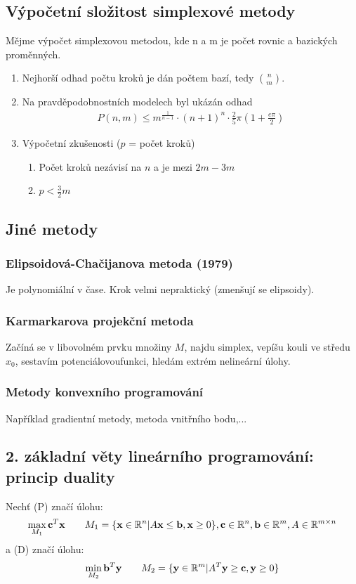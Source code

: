 \documentclass[a4paper,12pt,titlepage]{article}
\begin{document}
\subsection{Výpočetní složitost simplexové metody}
\setcounter{equation}{0}
Mějme výpočet simplexovou metodou, kde n a m je počet rovnic a bazických
proměnných.
\begin{enumerate}
	\item Nejhorší odhad počtu kroků je dán počtem bazí, tedy $\binom{n}{m}$.
	\item Na pravděpodobnostních modelech byl ukázán odhad 
	\begin{align}
		P(n,m) \le
		m^{\frac{1}{n-1}} \cdot (n+1)^n \cdot \frac{2}{5} \pi \left( 1 + \frac{e
		\pi}{2}\right)
	\end{align}
	\item Výpočetní zkušenosti ($p$ = počet kroků)
	\begin{enumerate}
		\item Počet kroků nezávisí na $n$ a je mezi $2m-3m$
		\item $p < \frac{3}{2} m$
	\end{enumerate}
\end{enumerate}


\subsection{Jiné metody}
\setcounter{equation}{0}
\subsubsection{Elipsoidová-Chačijanova metoda (1979)}
\setcounter{equation}{0}
Je polynomiální v čase. Krok velmi nepraktický (zmenšují se elipsoidy).
\subsubsection{Karmarkarova projekční metoda}
\setcounter{equation}{0}
Začíná se v libovolném prvku množiny $M$, najdu simplex, vepíšu kouli ve středu
$x_0$, sestavím potenciálovoufunkci, hledám extrém nelineární úlohy.
\subsubsection{Metody konvexního programování}
\setcounter{equation}{0}
Například gradientní metody, metoda vnitřního bodu,...



\subsection{2. základní věty lineárního programování: princip duality}
\setcounter{equation}{0}
Nechť (P) značí úlohu: 
\begin{align}
	\max_{M_1} \mathbf{c}^T \mathbf{x} \qquad M_1 = \{\mathbf{x}\in \mathbb{R}^n | A\mathbf{x} \le \mathbf{b}, \mathbf{x} \ge 0
	\}, \mathbf{c} \in \mathbb{R}^n, \mathbf{b} \in \mathbb{R}^m, A \in \mathbb{R}^{m\times n}
\end{align}
a (D) značí úlohu:
\begin{align}
	\min_{M_2} \mathbf{b}^T \mathbf{y} \qquad M_2 = \{ \mathbf{y}\in\mathbb{R}^m | A^T \mathbf{y} \ge \mathbf{c}, \mathbf{y} \ge 0
	\}
\end{align}
\end{document}
